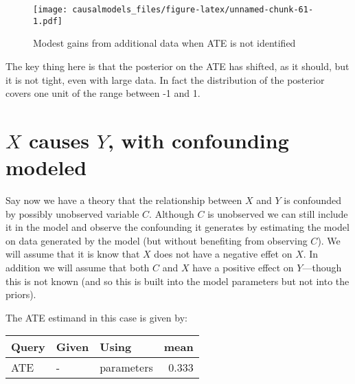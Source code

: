 \documentclass[
  12pt,
]{book}
\newenvironment{Shaded}{\begin{snugshade}}{\end{snugshade}}
\newcommand{\DataTypeTok}[1]{\textcolor[rgb]{0.13,0.29,0.53}{#1}}
\newcommand{\DecValTok}[1]{\textcolor[rgb]{0.00,0.00,0.81}{#1}}
\newcommand{\KeywordTok}[1]{\textcolor[rgb]{0.13,0.29,0.53}{\textbf{#1}}}
\newcommand{\NormalTok}[1]{#1}
\newcommand{\OperatorTok}[1]{\textcolor[rgb]{0.81,0.36,0.00}{\textbf{#1}}}
\newcommand{\StringTok}[1]{\textcolor[rgb]{0.31,0.60,0.02}{#1}}
\begin{document}
\begin{figure}
\centering
\texttt{[image: causalmodels\_files/figure-latex/unnamed-chunk-61-1.pdf]}
\caption{\label{fig:unnamed-chunk-61}Modest gains from additional data when ATE is not identified}
\end{figure}

The key thing here is that the posterior on the ATE has shifted, as it should, but it is not tight, even with large data. In fact the distribution of the posterior covers one unit of the range between -1 and 1.

\hypertarget{x-causes-y-with-confounding-modeled}{%
\section{\texorpdfstring{\(X\) causes \(Y\), with confounding modeled}{X causes Y, with confounding modeled}}\label{x-causes-y-with-confounding-modeled}}

Say now we have a theory that the relationship between \(X\) and \(Y\) is confounded by possibly unobserved variable \(C\). Although \(C\) is unobserved we can still include it in the model and observe the confounding it generates by estimating the model on data generated by the model (but without benefiting from observing \(C\)).
We will assume that it is know that \(X\) does not have a negative effet on \(X\). In addition we will assume that both \(C\) and \(X\) have a positive effect on \(Y\)---though this is not known (and so this is built into the model parameters but not into the priors).

\begin{Shaded}
\end{Shaded}

The ATE estimand in this case is given by:

\begin{tabular}{l|l|l|r}
\hline
Query & Given & Using & mean\\
\hline
ATE & - & parameters & 0.333\\
\hline
\end{tabular}
\end{document}
